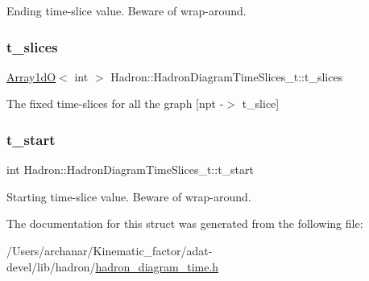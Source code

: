 Ending time-\/slice value. Beware of wrap-\/around. \mbox{\label{structHadron_1_1HadronDiagramTimeSlices__t_a870700ce888c6a61a69bd1bb8b935ac0}} 
\subsubsection{\texorpdfstring{t\_slices}{t\_slices}}
{\footnotesize\ttfamily \mbox{\hyperlink{classADAT_1_1Array1dO}{Array1dO}}$<$ int $>$ Hadron\+::\+Hadron\+Diagram\+Time\+Slices\+\_\+t\+::t\+\_\+slices}

The fixed time-\/slices for all the graph \mbox{[}npt -\/$>$ t\+\_\+slice\mbox{]} \mbox{\label{structHadron_1_1HadronDiagramTimeSlices__t_ace776097f7b2bb23862493b7e5621002}} 
\subsubsection{\texorpdfstring{t\_start}{t\_start}}
{\footnotesize\ttfamily int Hadron\+::\+Hadron\+Diagram\+Time\+Slices\+\_\+t\+::t\+\_\+start}

Starting time-\/slice value. Beware of wrap-\/around. 

The documentation for this struct was generated from the following file\+:\begin{DoxyCompactItemize}
\item 
/\+Users/archanar/\+Kinematic\+\_\+factor/adat-\/devel/lib/hadron/\mbox{\hyperlink{adat-devel_2lib_2hadron_2hadron__diagram__time_8h}{hadron\+\_\+diagram\+\_\+time.\+h}}\end{DoxyCompactItemize}
